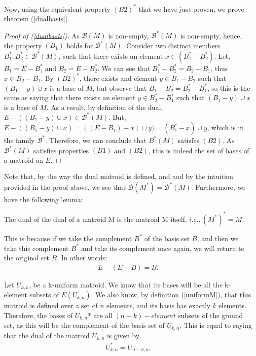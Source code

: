 Now, using the equivalent property $(B2)^*$ that we have just proven, we prove theorem (\ref{dualbasis}).
\begin{proof}[Proof of (\ref{dualbasis})]
    As $\mathcal{B}(M)$ is non-empty, $\mathcal{B}^*(M)$ is non-empty, hence, the property $(B_1)$ holds for $\mathcal{B}^*(M)$. 
    Consider two distinct members $B^* _1 , B ^* _2 \in \mathcal{B}^*(M)$, such that there exists an element $x \in (B^*_1 - B^*_2)$. Let, $B_1 = E - B^*_1$ and $B_2 = E - B^*_2$. We can see that $B^*_1 - B^*_2 = B_2 - B_1$, thus $x \in B_2 - B_1$. By ${(B2)}^*$, there exists and element $y \in  B_1 - B_2$ such that $(B_1 - y)\cup x$ is a base of $M$, but observe that $B_1 - B_2 = B^*_2 - B^*_1$, so this is the same as saying that there exists an element $y \in  B^*_2 - B^*_1$ such that $(B_1 - y)\cup x$ is a base of $M$. As a result, by definition of the dual, $E-((B_1 - y)\cup x) \in \mathcal{B}^*(M)$. But, $E-((B_1 - y)\cup x) = ((E-B_1)-x)\cup y) = (B_1^* - x)\cup y$, which is in the family $\mathcal{B}^*$. Therefore, we can conclude that $B^*(M)$ satisfes $(B2)$. As $\mathcal{B}^*(M)$ satisfies  properties $(B1)$ and $(B2)$, this is indeed the set of bases of a matroid on $E$.
\end{proof}

Note that, by the way the dual matroid is defined, and and by the intuition provided in the proof above, we see that $\mathcal{B}(M^*)=\mathcal{B}^*(M)$. Furthermore, we have the following lemma:

\begin{lemma}
    The dual of the dual of a matroid M is the matroid M itself, $i.e., (M^*)^* = M$.
\end{lemma}

This is because if we take the complement $B^*$ of the basis set $B$, and then we take this complement $B^*$ and take its complement once again, we will return to the original set $B$. In other words:
\begin{align*}
E-(E - B) = B.
\end{align*}

\begin{exmp}
    Let $U_{k,n}$, be a k-uniform matroid. We know that its bases will be all the k-element subsets of $E(U_{k,n})$. We also know, by definition (\ref{uniformM}), that this matroid is defined over a set of $n$ elements, and its basis has exactly $k$ elements. Therefore, the bases of $U_{k,n}$* are all $(n-k)-element$ subsets of the ground set, as this will be the complement of the basis set of $U_{k,n}$. This is equal to saying that the dual of the matroid $U_{k,n}$ is given by 
    \begin{align*}
    U_{k,n} ^*  = U_{n-k,n}.
    \end{align*}
\end{exmp}

